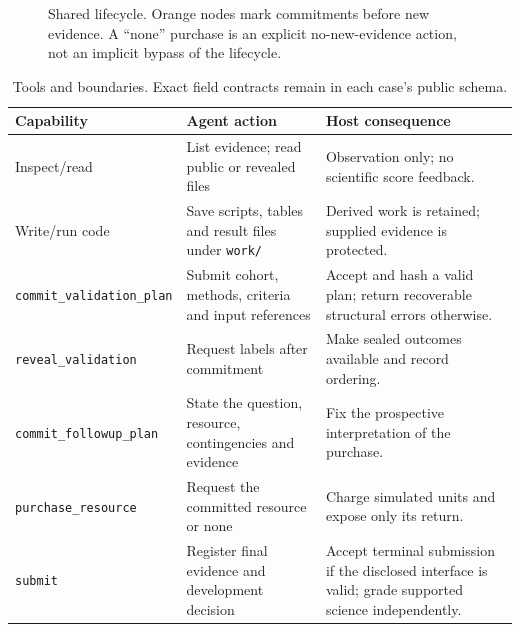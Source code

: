 \documentclass[11pt,a4paper]{article}
\begin{document}
\begin{figure}[H]\centering
{}
\caption{Shared lifecycle. Orange nodes mark commitments before new evidence. A ``none'' purchase is an explicit no-new-evidence action, not an implicit bypass of the lifecycle.}
\end{figure}

\begin{table}[H]\small
\caption{Tools and boundaries. Exact field contracts remain in each case's public schema.}
\begin{tabularx}{\textwidth}{@{}lYY@{}}\toprule
Capability & Agent action & Host consequence \\\midrule
Inspect/read & List evidence; read public or revealed files & Observation only; no scientific score feedback. \\
Write/run code & Save scripts, tables and result files under \texttt{work/} & Derived work is retained; supplied evidence is protected. \\
\texttt{commit\_validation\_plan} & Submit cohort, methods, criteria and input references & Accept and hash a valid plan; return recoverable structural errors otherwise. \\
\texttt{reveal\_validation} & Request labels after commitment & Make sealed outcomes available and record ordering. \\
\texttt{commit\_followup\_plan} & State the question, resource, contingencies and evidence & Fix the prospective interpretation of the purchase. \\
\texttt{purchase\_resource} & Request the committed resource or none & Charge simulated units and expose only its return. \\
\texttt{submit} & Register final evidence and development decision & Accept terminal submission if the disclosed interface is valid; grade supported science independently. \\\bottomrule
\end{tabularx}
\end{table}
\end{document}
